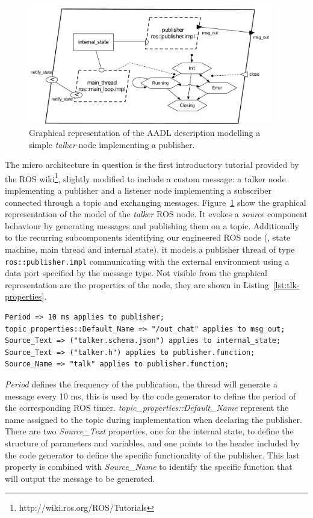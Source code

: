 \begin{figure}[t]
\centering
\includegraphics[width=0.95\textwidth]{gfx/usecase-publisher}
\caption{Graphical representation of the AADL description modelling a simple \textit{talker} node implementing a publisher.}\label{fig:usecase-publisher}
\end{figure}

The micro architecture in question is the first introductory tutorial provided by the ROS wiki\footnote{http://wiki.ros.org/ROS/Tutorials}, slightly modified to include a custom message: a talker node implementing a publisher and a listener node implementing a subscriber connected through a topic and exchanging messages. Figure~\ref{fig:usecase-publisher} show the graphical representation of the model of the \textit{talker} ROS node. It evokes a \textit{source} component behaviour by generating messages and publishing them on a topic. Additionally to the recurring subcomponents identifying our engineered ROS node (\ie, state machine, main thread and internal state), it models a publisher thread of type \texttt{ros::publisher.impl} communicating with the external environment using a data port specified by the message type. Not visible from the graphical representation are the properties of the node, they are shown in Listing~\ref{lst:tlk-properties}.

\begin{lstlisting}[language=AADL,caption={TODO},label=lst:tlk-properties]
Period => 10 ms applies to publisher;
topic_properties::Default_Name => "/out_chat" applies to msg_out;
Source_Text => ("talker.schema.json") applies to internal_state;
Source_Text => ("talker.h") applies to publisher.function;
Source_Name => "talk" applies to publisher.function;
\end{lstlisting}

\textit{Period} defines the frequency of the publication, the thread will generate a message every 10 ms, this is used by the code generator to define the period of the corresponding ROS timer. \textit{topic\_properties::Default\_Name} represent the name assigned to the topic during implementation when declaring the publisher. There are two \textit{Source\_Text} properties, one for the internal state, to define the structure of parameters and variables, and one points to the header included by the code generator to define the specific functionality of the publisher. This last property is combined with \textit{Source\_Name} to identify the specific function that will output the message to be generated.

